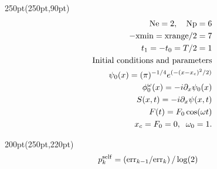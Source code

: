 \begin{frame}
\begin{textblock*}{250pt}(250pt,90pt)
	\begin{align}
         {\rm Ne} = 2,\hspace{10pt} {\rm Np}  = 6 &\nonumber\\
		-{\rm xmin} = {\rm xrange}/2  = 7 &\nonumber\\
		             t_1 = -t_0 = T/2 = 1 &\nonumber\\
	  \mbox{Initial conditions and parameters}&\nonumber\\
       \psi_0(x) = (\pi)^{-1/4}e^{(-(x-x_c)^2/2)} &\nonumber\\
	 \phi^\omega_0(x) = -i\partial_x \psi_0(x)&\nonumber\\
		    S(x,t) = -i\partial_x\psi(x,t)&\nonumber\\
		          F(t) = F_0\cos(\omega t)&\nonumber\\
		     x_c = F_0 = 0,\;\;\omega_0 = 1. \nonumber
         \end{align}
\end{textblock*}
\begin{textblock*}{200pt}(250pt,220pt)
	\begin{align}
	p_k^{\rm self} & = \left({\rm err}_{k-1}/{\rm err}_{k}\right)/\log(2) \nonumber
	\end{align}

\end{textblock*}


\end{frame}


